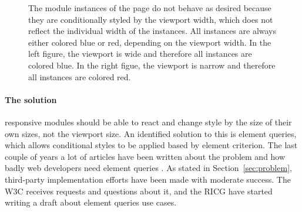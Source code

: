 \documentclass[a4paper,11pt]{kth-mag}
\begin{document}
\begin{figure}[ht]
\begin{minipage}{.5\textwidth}
          \end{minipage}
          \caption{
            The module instances of the page do not behave as desired because they are conditionally styled by the viewport width, which does not reflect the individual width of the instances.
            All instances are always either colored blue or red, depending on the viewport width.
            In the left figure, the viewport is wide and therefore all instances are colored blue.
            In the right figue, the viewport is narrow and therefore all instances are colored red.
          }
          \label{fig:problem-mq}
        \end{figure}

        \paragraph{The solution}
        \Gls{responsive} modules should be able to react and change style by the size of their own sizes, not the \gls{viewport} size.
        An identified solution to this is element queries, which allows conditional styles to be applied based by \gls{element} criterion.
        The last couple of years a lot of articles have been written about the problem and how badly \gls{web} developers need element queries \cite{eq_article_localised-css,eq_article_backalley,eq_article_mqhack,eq_article_tabatkjr,eq_article_filament,eq_article_tyson,eq_article_neal,eq_article_css-tricks,eq_article_hugo,eq_article_fremycompany,eq_article_discource,eq_article_matt}.
        As stated in Section~\ref{sec:problem}, \gls{third-party} implementation efforts have been made with moderate success.
        The \gls{W3C} receives requests and questions about it, and the \gls{RICG} have started writing a draft \cite{ricg_draft} about element queries use cases.

\end{document}
